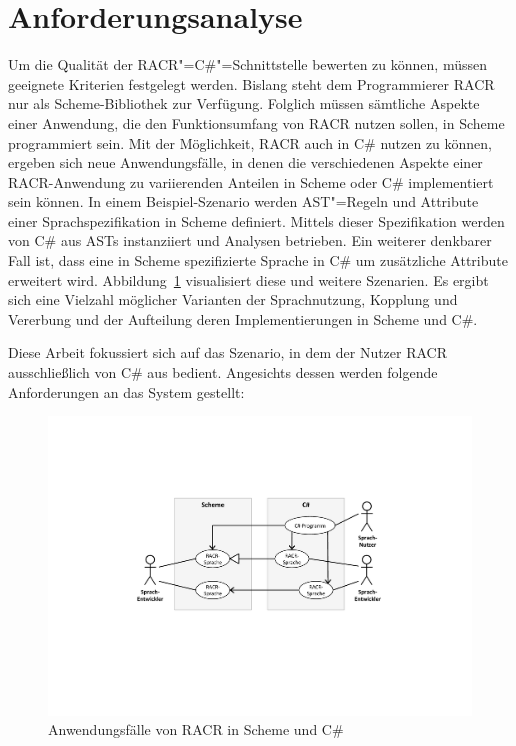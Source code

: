 \section{Anforderungsanalyse}\label{anforderungen1}

Um die Qualität der RACR"=C\#"=Schnittstelle bewerten zu können, müssen geeignete Kriterien festgelegt werden. Bislang steht dem Programmierer RACR nur als Scheme-Bibliothek zur Verfügung. Folglich müssen sämtliche Aspekte einer Anwendung, die den Funktionsumfang von RACR nutzen sollen, in Scheme programmiert sein. Mit der Möglichkeit, RACR auch in C\# nutzen zu können, ergeben sich neue Anwendungsfälle, in denen die verschiedenen Aspekte einer RACR-Anwendung zu variierenden Anteilen in Scheme oder C\# implementiert sein können. In einem Beispiel-Szenario werden AST"=Regeln und Attribute einer Sprachspezifikation in Scheme definiert. Mittels dieser Spezifikation werden von C\# aus ASTs instanziiert und Analysen betrieben. Ein weiterer denkbarer Fall ist, dass eine in Scheme spezifizierte Sprache in C\# um zusätzliche Attribute erweitert wird. Abbildung~\ref{fig:usecase} visualisiert diese und weitere Szenarien. Es ergibt sich eine Vielzahl möglicher Varianten der Sprachnutzung, Kopplung und Vererbung und der Aufteilung deren Implementierungen in Scheme und C\#.

Diese Arbeit fokussiert sich auf das Szenario, in dem der Nutzer RACR ausschließlich von C\# aus bedient. Angesichts dessen werden folgende Anforderungen an das System gestellt:

\begin{figure}
	\centering
	\includegraphics[width=0.9\linewidth]{figures/racr-net-use-cases.pdf}
	\caption{Anwendungsfälle von RACR in Scheme und C\#}
	\label{fig:usecase}
\end{figure}

